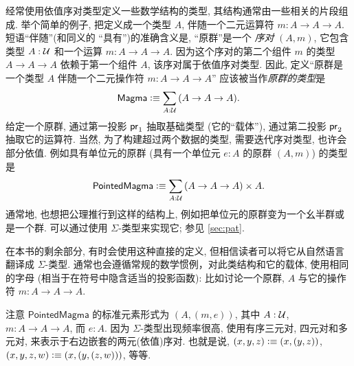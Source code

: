 经常使用依值序对类型定义一些数学结构的类型, 其结构通常由一些相关的片段组成.
举个简单的例子, 把定义成一个类型 $A$, 伴随一个二元运算符 $m:A\to A\to A$.
短语``伴随''(和同义的 ``具有'')的准确含义是, ``原群''是一个 \emph{序对} $(A,m)$, 它包含类型 $A:\mathcal{U}$ 和一个运算 $m:A\to A\to A$.
因为这个序对的第二个组件 $m$ 的类型 $A\to A\to A$ 依赖于第一个组件 $A$, 该序对属于依值序对类型.
因此, 定义``原群是一个类型 $A$ 伴随一个二元操作符 $m:A\to A\to A$'' 应该被当作\emph{原群的类型}是
\[
    \mathsf{Magma} \defeq \sm{A:\UU} (A\to A\to A).
\]
给定一个原群, 通过第一投影 $\mathsf{pr}_{1}$ 抽取基础类型 (它的``载体''), 通过第二投影 $\mathsf{pr}_{2}$ 抽取它的运算符.
当然, 为了构建超过两个数据的类型, 需要迭代序对类型, 也许会部分依值.
例如具有单位元的原群 (具有一个单位元 $e:A$ 的原群 $(A,m)$) 的类型是
\[
    \mathsf{PointedMagma} \defeq \sm{A:\UU} (A\to A\to A) \times A.
\]
通常地, 也想把公理推行到这样的结构上, 例如把单位元的原群变为一个幺半群或是一个群.
可以通过使用 $\Sigma$-类型来实现它;
参见 \cref{sec:pat}.

在本书的剩余部分, 有时会使用这种直接的定义, 但相信读者可以将它从自然语言翻译成 $\Sigma$-类型.
通常也会遵循常规的数学惯例，对此类结构和它的载体, 使用相同的字母 (相当于在符号中隐含适当的投影函数): 比如讨论一个原群, $A$ 与它的操作符 $m:A\to A\to A$.

注意 $\mathsf{PointedMagma}$ 的标准元素形式为 $(A,(m,e))$, 其中 $A:\mathcal{U}$, $m:A\to A\to A$, 而 $e:A$.
因为 $\Sigma$-类型出现频率很高, 使用有序三元对, 四元对和多元对, 来表示于右边嵌套的两元(依值)序对.
也就是说, $(x,y,z) \vcentcolon\equiv (x,(y,z))$, $(x,y,z,w)\vcentcolon\equiv (x,(y,(z,w)))$, 等等.

%
